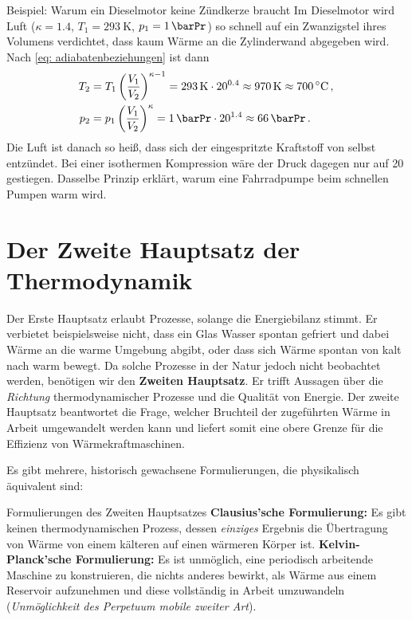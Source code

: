 \begin{examplebox}[]{Beispiel: Warum ein Dieselmotor keine Zündkerze braucht}
    Im Dieselmotor wird Luft ($\kappa = \num{1.4}$, $T_1 = \SI{293}{\kelvin}$, $p_1 = \SI{1}{\barPr}$) so schnell auf ein Zwanzigstel ihres Volumens verdichtet, dass kaum Wärme an die Zylinderwand abgegeben wird. Nach \cref{eq: adiabatenbeziehungen} ist dann
    \begin{align*}
        T_2 &= T_1 \left(\frac{V_1}{V_2}\right)^{\kappa - 1} = \SI{293}{\kelvin} \cdot 20^{\num{0.4}} \approx \SI{970}{\kelvin} \approx \SI{700}{\celsius} \mComma \\
        p_2 &= p_1 \left(\frac{V_1}{V_2}\right)^{\kappa} = \SI{1}{\barPr} \cdot 20^{\num{1.4}} \approx \SI{66}{\barPr} \mDot
    \end{align*}
    Die Luft ist danach so heiß, dass sich der eingespritzte Kraftstoff von selbst entzündet. Bei einer isothermen Kompression wäre der Druck dagegen nur auf \SI{20}{\barPr} gestiegen. Dasselbe Prinzip erklärt, warum eine Fahrradpumpe beim schnellen Pumpen warm wird.
\end{examplebox}


\section{Der Zweite Hauptsatz der Thermodynamik}\label{sec: zweiter_hauptsatz}
Der Erste Hauptsatz erlaubt Prozesse, solange die Energiebilanz stimmt. Er verbietet beispielsweise nicht, dass ein Glas Wasser spontan gefriert und dabei Wärme an die warme Umgebung abgibt, oder dass sich Wärme spontan von kalt nach warm bewegt. Da solche Prozesse in der Natur jedoch nicht beobachtet werden, benötigen wir den \textbf{Zweiten Hauptsatz}. Er trifft Aussagen über die \textit{Richtung} thermodynamischer Prozesse und die Qualität von Energie. Der zweite Hauptsatz beantwortet die Frage, welcher Bruchteil der zugeführten Wärme in Arbeit umgewandelt werden kann und liefert somit eine obere Grenze für die Effizienz von Wärmekraftmaschinen.

Es gibt mehrere, historisch gewachsene Formulierungen, die physikalisch äquivalent sind:
\begin{importantbox}{Formulierungen des Zweiten Hauptsatzes}
    \textbf{Clausius'sche Formulierung:}
    Es gibt keinen thermodynamischen Prozess, dessen \textit{einziges} Ergebnis die Übertragung von Wärme von einem kälteren auf einen wärmeren Körper ist.
    \tcblower
    \textbf{Kelvin-Planck'sche Formulierung:}
    Es ist unmöglich, eine periodisch arbeitende Maschine zu konstruieren, die nichts anderes bewirkt, als Wärme aus einem Reservoir aufzunehmen und diese vollständig in Arbeit umzuwandeln (\textit{Unmöglichkeit des Perpetuum mobile zweiter Art}).
\end{importantbox}

